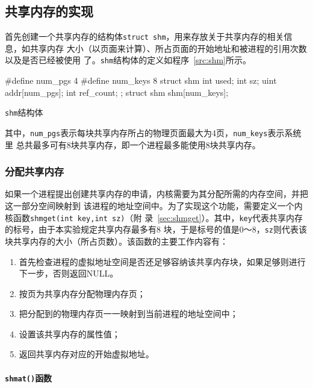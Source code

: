 \documentclass{swfcthesismscctex}
\begin{document}
\subsection{共享内存的实现}

首先创建一个共享内存的结构体\texttt{struct shm}，用来存放关于共享内存的相关信息，如共享内存
大小（以页面来计算）、所占页面的开始地址和被进程的引用次数以及是否已经被使用
了。\texttt{shm}结构体的定义如程序~\ref{src:shm}所示。

\begin{listing}
\begin{codeblock}
\begin{ccode}
#define num_pgs 4
#define num_keys 8
struct shm{
  int used;
  int sz;
  uint addr[num_pgs];
  int ref_count;
};
struct shm shm[num_keys];
\end{ccode}
\end{codeblock}
\caption{\texttt{shm}结构体}\label{src:shm}
\end{listing}

其中，\texttt{num\_pgs}表示每块共享内存所占的物理页面最大为4页，\texttt{num\_keys}表示系统里
总共最多可有8块共享内存，即一个进程最多能使用8块共享内存。

\subsubsection{分配共享内存}

如果一个进程提出创建共享内存的申请，内核需要为其分配所需的内存空间，并把这一部分空间映射到
该进程的地址空间中。为了实现这个功能，需要定义一个内核函数\texttt{shmget(int key,int sz)}（附
录~\ref{sec:shmget}）。其中，\texttt{key}代表共享内存的标号，由于本实验规定共享内存最多有8
块，于是标号的值是0～8，\texttt{sz}则代表该块共享内存的大小（所占页数）。该函数的主要工作内容有：
\begin{enumerate}
\item 首先检查进程的虚拟地址空间是否还足够容纳该共享内存块，如果足够则进行下一步，否则返回NULL。
\item 按页为共享内存分配物理内存页；
\item 把分配到的物理内存页一一映射到当前进程的地址空间中；
\item 设置该共享内存的属性值；
\item 返回共享内存对应的开始虚拟地址。
\end{enumerate}

\paragraph{\texttt{shmat()}函数}
\end{document}
